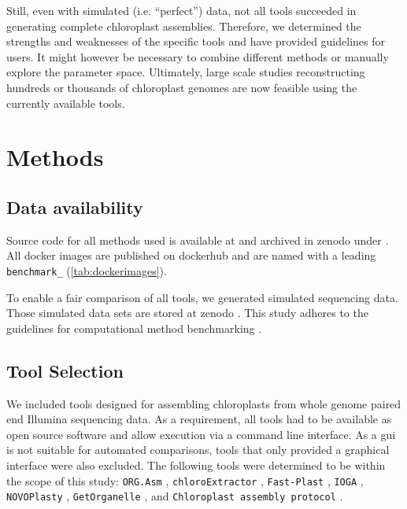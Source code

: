 \documentclass{bmcart}
\newcommand{\formatprogramnames}[1]{\texttt{#1}}
\newcommand{\ce}{\formatprogramnames{chloroExtractor}}
\newcommand{\oa}{\formatprogramnames{ORG.Asm}}
\newcommand{\fp}{\formatprogramnames{Fast-Plast}}
\newcommand{\ioga}{\formatprogramnames{IOGA}}
\newcommand{\np}{\formatprogramnames{NOVOPlasty}}
\newcommand{\go}{\formatprogramnames{GetOrganelle}}
\newcommand{\cassp}{\formatprogramnames{Chloroplast assembly protocol}}
\newcommand{\zenododataset}{\cite{zenododataset}}
\newcommand{\zenodorepo}{\cite{zenodorepo}}
\begin{document}
Still, even with simulated (i.e. ``perfect'') data, not all tools succeeded in generating complete chloroplast assemblies.
Therefore, we determined the strengths and weaknesses of the specific tools and have provided guidelines for users.
It might however be necessary to combine different methods or manually explore the parameter space.
Ultimately, large scale studies reconstructing hundreds or thousands of chloroplast genomes are now feasible using the currently available tools. 

\section*{Methods}
\subsection*{Data availability}
Source code for all methods used is available at \cite{github-benchmark-repo} and archived in zenodo under \zenodorepo{}.
All docker images are published on dockerhub \cite{dockerhub-benchmark} and are named with a leading \texttt{benchmark\_} (\cref{tab:dockerimages}).

To enable a fair comparison of all tools, we generated simulated sequencing data.
Those simulated data sets are stored at zenodo \zenododataset{}.
This study adheres to the guidelines for computational method benchmarking \cite{weber_essential_2018}.

\subsection*{Tool Selection}
We included tools designed for assembling chloroplasts from whole genome paired end Illumina sequencing data. As a requirement, all tools had to be available as open source software and allow execution via a command line interface. 
As a \gls{gui} is not suitable for automated comparisons, tools that only provided a graphical interface were also excluded.
The following tools were determined to be within the scope of this study:
\oa{} \cite{coissac_barcodes_2016}, 
\ce{} \cite{j_ankenbrand_chloroextractor:_2018}, 
\fp{} \cite{mckain__fast-plast_2017}, 
\ioga{} \cite{bakker_herbarium_2016}, 
\np{} \cite{dierckxsens_novoplasty:_2017}, 
\go{} \cite{jin_getorganelle:_2018}, and
\cassp{} \cite{sancho_comparative_2018}.
\end{document}
